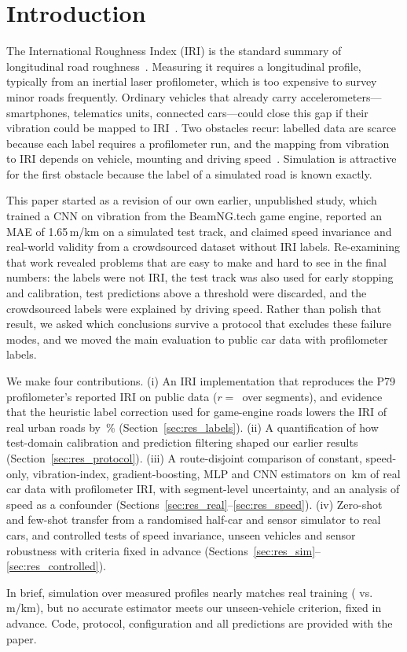 \section{Introduction}
\label{sec:intro}
The International Roughness Index (IRI) is the standard summary of longitudinal road roughness~\cite{sayers1986tp45,astm_e1926}.
Measuring it requires a longitudinal profile, typically from an inertial laser profilometer, which is too expensive to survey minor roads frequently.
Ordinary vehicles that already carry accelerometers---smartphones, telematics units, connected cars---could close this gap if their vibration could be mapped to IRI~\cite{sattar2018review,sang2024iri,levenberg2021lira}.
Two obstacles recur: labelled data are scarce because each label requires a profilometer run, and the mapping from vibration to IRI depends on vehicle, mounting and driving speed~\cite{sayers1986tp46,thilak2021,mounting2026}.
Simulation is attractive for the first obstacle because the label of a simulated road is known exactly.

This paper started as a revision of our own earlier, unpublished study, which trained a CNN on vibration from the BeamNG.tech game engine, reported an MAE of 1.65\,m/km on a simulated test track, and claimed speed invariance and real-world validity from a crowdsourced dataset without IRI labels.
Re-examining that work revealed problems that are easy to make and hard to see in the final numbers: the labels were not IRI, the test track was also used for early stopping and calibration, test predictions above a threshold were discarded, and the crowdsourced labels were explained by driving speed.
Rather than polish that result, we asked which conclusions survive a protocol that excludes these failure modes, and we moved the main evaluation to public car data with profilometer labels.

We make four contributions.
(i) An IRI implementation that reproduces the P79 profilometer's reported IRI on public data ($r=$\,\iriValR{} over \iriValN{} segments), and evidence that the heuristic label correction used for game-engine roads lowers the IRI of real urban roads by \legacyCorrUrbanMape\,\% (Section~\ref{sec:res_labels}).
(ii) A quantification of how test-domain calibration and prediction filtering shaped our earlier results (Section~\ref{sec:res_protocol}).
(iii) A route-disjoint comparison of constant, speed-only, vibration-index, gradient-boosting, MLP and CNN estimators on \liraKm\,km of real car data with profilometer IRI, with segment-level uncertainty, and an analysis of speed as a confounder (Sections~\ref{sec:res_real}--\ref{sec:res_speed}).
(iv) Zero-shot and few-shot transfer from a randomised half-car and sensor simulator to real cars, and controlled tests of speed invariance, unseen vehicles and sensor robustness with criteria fixed in advance (Sections~\ref{sec:res_sim}--\ref{sec:res_controlled}).

In brief, simulation over measured profiles nearly matches real training (\zsPsevenGbmMae{} vs.\ \liraGbmMae\,m/km), but no accurate estimator meets our unseen-vehicle criterion, fixed in advance.
Code, protocol, configuration and all predictions are provided with the paper.
